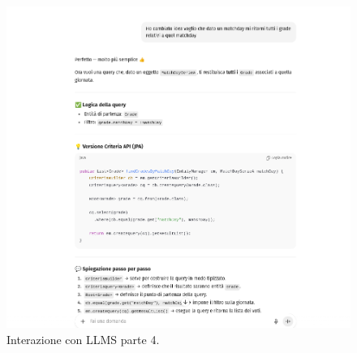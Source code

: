 \begin{figure}
    \centering
    \includegraphics[width=\textwidth]{Resources/InterazioneLLMS/InterazioneParte4.png}        
    \caption{Interazione con LLMS parte 4.}
    \label{fig:interazione_con_LLMS_parte_4}
\end{figure}
